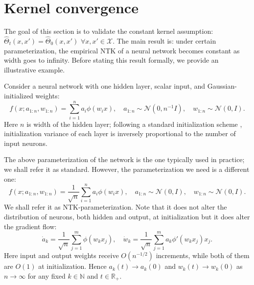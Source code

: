 \documentclass{article}
\newcommand{\XX}{\mathcal{X}}
\newcommand{\RR}{\mathbb{R}}
\newcommand{\NN}{\mathcal{N}}
\begin{document}
    \section{Kernel convergence}
    \label{sec:convergence}

    The goal of this section is to validate the constant kernel assumption: $\hat\Theta_t(x,x') = \hat\Theta_0(x,x')$ $\forall x,x' \in \XX$.
    The main result is: under certain parameterization, the empirical NTK of a neural network becomes constant as width goes to infinity.
    Before stating this result formally, we provide an illustrative example.

    Consider a neural network with one hidden layer, scalar input, and Gaussian-initialized weights:
    \begin{equation}
        f(x; a_{1:n}, w_{1:n})
        = \sum_{i=1}^n a_i \phi(w_i x),
        \quad
        a_{1:n} \sim \NN(0, n^{-1} I),
        \quad
        w_{1:n} \sim \NN(0, I).
        \label{eq:1_hid_net_standard}
    \end{equation}
    Here $n$ is width of the hidden layer; following a standard initialization scheme \cite{he2015delving}, initialization variance of each layer is inversely proportional to the number of input neurons.

    The above parameterization of the network is the one typically used in practice; we shall refer it as standard.
    However, the parameterization we need is a different one:
    \begin{equation}
        f(x; a_{1:n}, w_{1:n})
        = \frac{1}{\sqrt{n}} \sum_{i=1}^n a_i \phi(w_i x),
        \quad
        a_{1:n} \sim \NN(0, I),
        \quad
        w_{1:n} \sim \NN(0, I).
        \label{eq:1_hid_net_ntk}
    \end{equation}
    We shall refer it as NTK-parameterization.
    Note that it does not alter the distribution of neurons, both hidden and output, at initialization but it does alter the gradient flow:
    \begin{equation}
        \dot a_k 
        = \frac{1}{\sqrt{n}} \sum_{j=1}^m \phi(w_k x_j),
        \quad
        \dot w_k
        = \frac{1}{\sqrt{n}} \sum_{j=1}^m a_k \phi'(w_k x_j) x_j.
    \end{equation}
    Here input and output weights receive $O(n^{-1/2})$ increments, while both of them are $O(1)$ at initialization.
    Hence $a_k(t) \to a_k(0)$ and $w_k(t) \to w_k(0)$ as $n \to \infty$ for any fixed $k \in \mathbb{N}$ and $t \in \RR_+$.
\end{document}

